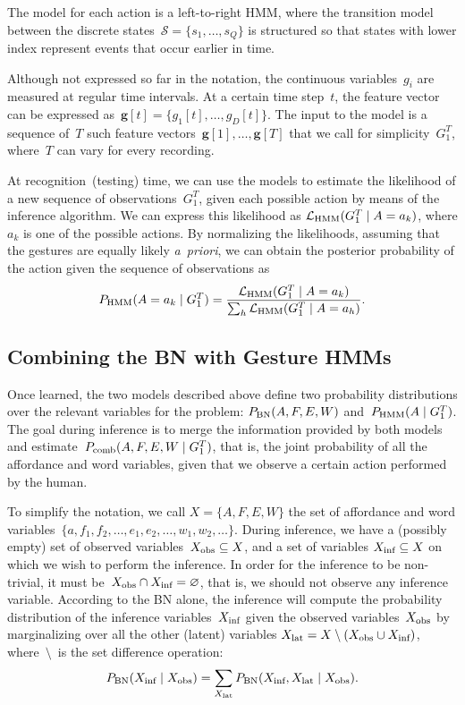 The model for each action is a left-to-right \ac{HMM}, where the transition model between the discrete states~$\mathcal{S} = \{s_1, \dots, s_Q\}$ is structured so that states with lower index represent events that occur earlier in time.

Although not expressed so far in the notation, the continuous variables~$g_i$ are measured at regular time intervals.
At a certain time step~$t$, the feature vector can be expressed as~$\bm{g}[t] = \{g_1[t], \dots, g_D[t]\}$.
The input to the model is a sequence of~$T$ such feature vectors~$\bm{g}[1], \dots, \bm{g}[T]$ that we call for simplicity~$G_1^T$, where~$T$ can vary for every recording.

At recognition~(testing) time, we can use the models to estimate the likelihood of a new sequence of observations~$G_1^T$, given each possible action by means of the \FB{} inference algorithm.
We can express this likelihood as $\mathcal{L}_\text{HMM}(G_1^T \mid A=a_k)$, where $a_k$ is one of the possible actions.
By normalizing the likelihoods, assuming that the gestures are equally likely \emph{a~priori}, we can obtain the posterior probability of the action given the sequence of observations as
\begin{equation} \label{eq:phmm_action}
  \phmm(A=a_k \given G_1^T) = \frac{\mathcal{L}_\text{HMM}(G_1^T \given A=a_k)}{\sum_h \mathcal{L}_\text{HMM}(G_1^T \given A=a_h)}.
\end{equation}

\subsection{Combining the \acs{BN} with Gesture \acsp{HMM}}
\label{sec:combination}
Once learned, the two models described above define two probability distributions over the relevant variables for the problem:
$P_{\text{BN}}(A, F, E, W)$ and~$P_{\text{HMM}}(A \mid G_1^T)$.
The goal during inference is to merge the information provided by both models and estimate~$P_\text{comb}(A, F, E, W \mid G_1^T)$, that is, the joint probability of all the affordance and word variables, given that we observe a certain action performed by the human.

To simplify the notation, we call $X = \{A, F, E, W\}$ the set of affordance and word variables~$\{a, f_1, f_2, \dots, e_1, e_2, \dots, w_1, w_2, \dots\}$.
During inference, we have a (possibly empty) set of observed variables~$X_\text{obs} \subseteq X$, and a set of variables $X_\text{inf} \subseteq X$ on which we wish to perform the inference.
In order for the inference to be non-trivial, it must be~$X_\text{obs} \cap X_\text{inf} = \varnothing$, that is, we should not observe any inference variable.
According to the \ac{BN} alone, the inference will compute the probability distribution of the inference variables~$X_\text{inf}$ given the observed variables~$X_\text{obs}$ by marginalizing over all the other (latent) variables $X_\text{lat} = X \setminus (X_\text{obs} \cup X_\text{inf})$, where~$\setminus$~is the set difference operation:
\begin{equation*}
 P_{\text{BN}}(X_\text{inf} \mid X_\text{obs}) = \sum_{X_\text{lat}} P_{\text{BN}}(X_\text{inf}, X_\text{lat} \mid X_\text{obs}).
\end{equation*}

